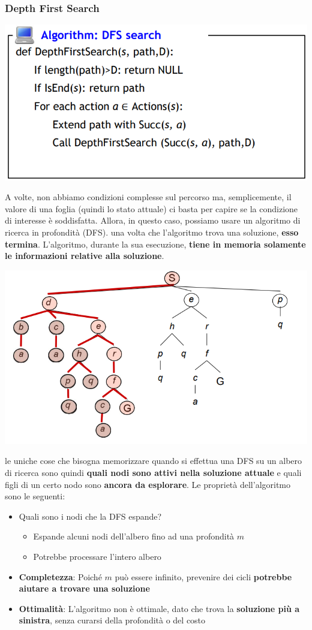 \documentclass[12pt]{article}
\begin{document}
\subsubsection{Depth First Search}
\begin{center}
    \includegraphics[width = 0.70\linewidth]{Images/27.PNG}
\end{center}
A volte, non abbiamo condizioni complesse sul percorso ma, semplicemente, il valore di una foglia (quindi lo stato attuale) ci basta per capire
se la condizione di interesse è soddisfatta. Allora, in questo caso, possiamo usare un algoritmo di ricerca in profondità (DFS).
una volta che l'algoritmo trova una soluzione, \textbf{esso termina}.
L'algoritmo, durante la sua esecuzione, \textbf{tiene in memoria solamente le informazioni relative alla soluzione}.
\begin{center}
    \includegraphics[width = 0.70\linewidth]{Images/28.PNG}
\end{center}
le uniche cose che bisogna memorizzare quando si effettua una DFS su un albero di ricerca sono quindi \textbf{quali nodi sono attivi nella soluzione attuale} e quali figli
di un certo nodo sono \textbf{ancora da esplorare}.
Le proprietà dell'algoritmo sono le seguenti:
\begin{itemize}
    \item Quali sono i nodi che la DFS espande?
    \begin{itemize}
        \item Espande alcuni nodi dell'albero fino ad una profondità $m$
        \item Potrebbe processare l'intero albero
    \end{itemize}
    \item \textbf{Completezza}: Poiché $m$ può essere infinito, prevenire dei cicli \textbf{potrebbe aiutare a trovare una soluzione}
    \item \textbf{Ottimalità}: L'algoritmo non è ottimale, dato che trova la \textbf{soluzione più a sinistra}, senza curarsi della profondità o del costo 
\end{itemize}
\end{document}
